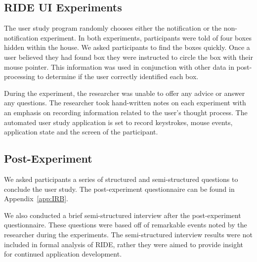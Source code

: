\subsection{RIDE UI Experiments} %
\label{sub:ride_ui_experiments}
The user study program randomly chooses either the notification or the non-notification experiment. In both experiments, participants were told of four boxes hidden within the house. We asked participants to find the boxes quickly. Once a user believed they had found box they were instructed to circle the box with their mouse pointer. This information was used in conjunction with other data in post-processing to determine if the user correctly identified each box.

During the experiment, the researcher was unable to offer any advice or answer any questions. The researcher took hand-written notes on each experiment with an emphasis on recording information related to the user's thought process. The automated user study application is set to record keystrokes, mouse events, application state and the screen of the participant.


\subsection{Post-Experiment} %
\label{sub:post_experiment}
We asked participants a series of structured and semi-structured questions to conclude the user study. The post-experiment questionnaire can be found in Appendix~\ref{app:IRB}.

We also conducted a brief semi-structured interview after the post-experiment questionnaire. These questions were based off of remarkable events noted by the researcher during the experiments. The semi-structured interview results were not included in formal analysis of RIDE, rather they were aimed to provide insight for continued application development.

